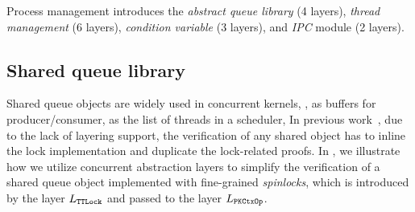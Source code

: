 {{Process management  introduces the
\emph{abstract queue library} (4 layers),
\emph{thread management} (6 layers),
\emph{condition variable} (3 layers),
and \emph{IPC} module (2 layers).}

\ignore{\begin{figure}
 = C, multicols=1] {source_code/enqueue.v}
\vspace{-5pt}
\caption{Specifications of local queue operations.}
\label{fig:exp:queue}
\vspace{-10pt}
\end{figure}}


\subsection{Shared queue library}
\label{sec:con:queue} 
Shared queue objects
are widely used in concurrent kernels, \eg, as buffers for producer/consumer,
as the list of threads in a scheduler, {\etc}
In previous work~\cite{lili16},
due to the lack of layering support,
the verification of any shared object
has to inline the lock implementation
and duplicate the lock-related proofs.
In \cCTOS, we illustrate how we utilize concurrent
abstraction layers to simplify the verification of a shared queue object 
implemented with fine-grained \emph{spinlocks}, which is introduced by the layer $L_{\texttt{TTLock}}$ and passed to the layer
$L_{\texttt{PKCtxOp}}$.


}
